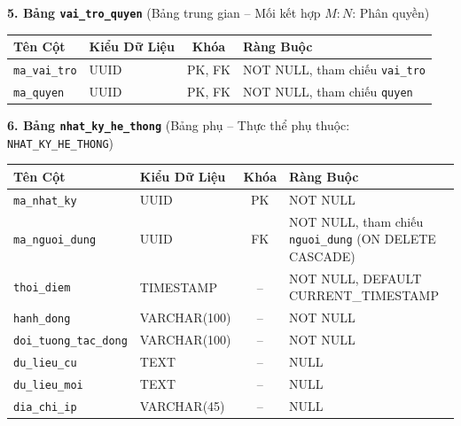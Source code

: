 \noindent\textbf{5. Bảng \texttt{vai\_tro\_quyen}} \quad (Bảng trung gian -- Mối kết hợp $M{:}N$: Phân quyền)
\vspace{0.2cm}

\begin{center}
\small
\renewcommand{\arraystretch}{1.2}
\begin{tabular}{|p{3.8cm}|p{2.5cm}|c|p{6.5cm}|}
\hline
\textbf{Tên Cột} & \textbf{Kiểu Dữ Liệu} & \textbf{Khóa} & \textbf{Ràng Buộc} \\ \hline
\texttt{ma\_vai\_tro} & UUID & PK, FK & NOT NULL, tham chiếu \texttt{vai\_tro} \\ \hline
\texttt{ma\_quyen} & UUID & PK, FK & NOT NULL, tham chiếu \texttt{quyen} \\ \hline
\end{tabular}
\end{center}
\vspace{0.3cm}

\noindent\textbf{6. Bảng \texttt{nhat\_ky\_he\_thong}} \quad (Bảng phụ -- Thực thể phụ thuộc: \texttt{NHAT\_KY\_HE\_THONG})
\vspace{0.2cm}

\begin{center}
\small
\renewcommand{\arraystretch}{1.2}
\begin{tabular}{|p{3.8cm}|p{2.5cm}|c|p{6.5cm}|}
\hline
\textbf{Tên Cột} & \textbf{Kiểu Dữ Liệu} & \textbf{Khóa} & \textbf{Ràng Buộc} \\ \hline
\texttt{ma\_nhat\_ky} & UUID & PK & NOT NULL \\ \hline
\texttt{ma\_nguoi\_dung} & UUID & FK & NOT NULL, tham chiếu \texttt{nguoi\_dung} (ON DELETE CASCADE) \\ \hline
\texttt{thoi\_diem} & TIMESTAMP & -- & NOT NULL, DEFAULT CURRENT\_TIMESTAMP \\ \hline
\texttt{hanh\_dong} & VARCHAR(100) & -- & NOT NULL \\ \hline
\texttt{doi\_tuong\_tac\_dong} & VARCHAR(100) & -- & NOT NULL \\ \hline
\texttt{du\_lieu\_cu} & TEXT & -- & NULL \\ \hline
\texttt{du\_lieu\_moi} & TEXT & -- & NULL \\ \hline
\texttt{dia\_chi\_ip} & VARCHAR(45) & -- & NULL \\ \hline
\end{tabular}
\end{center}
\vspace{0.3cm}


